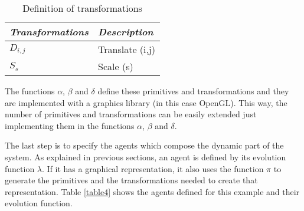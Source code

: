 \documentclass[runningheads]{llncs}
\begin{document}
\begin{table}[h]
\begin{center}
\begin{small}
\begin{tabular}{|l|l|}

	\hline \itshape Transformations & \itshape Description\\
	\hline $D_{i,j}$ & Translate (i,j)\\
	\hline $S_{s}$ & Scale (s)\\
	\hline

\end{tabular}
\end{small}
\caption{\label{table3} Definition of transformations}
\end{center}
\end{table}


The functions ${\alpha}$, ${\beta}$ and ${\delta}$ define these primitives and transformations 
and they are implemented with a graphics library (in this case OpenGL). This way, the number of 
primitives and transformations can be easily extended just implementing them in the functions 
${\alpha}$, ${\beta}$ and ${\delta}$.


The last step is to specify the agents which compose the dynamic part of the system. As explained in previous sections, an agent is defined by its evolution function $\lambda$. If it has a graphical representation, it also uses the function $\pi$ to generate the primitives and the transformations needed to create that representation. Table \ref{table4} shows the agents defined for this example and their evolution function.
\end{document}
